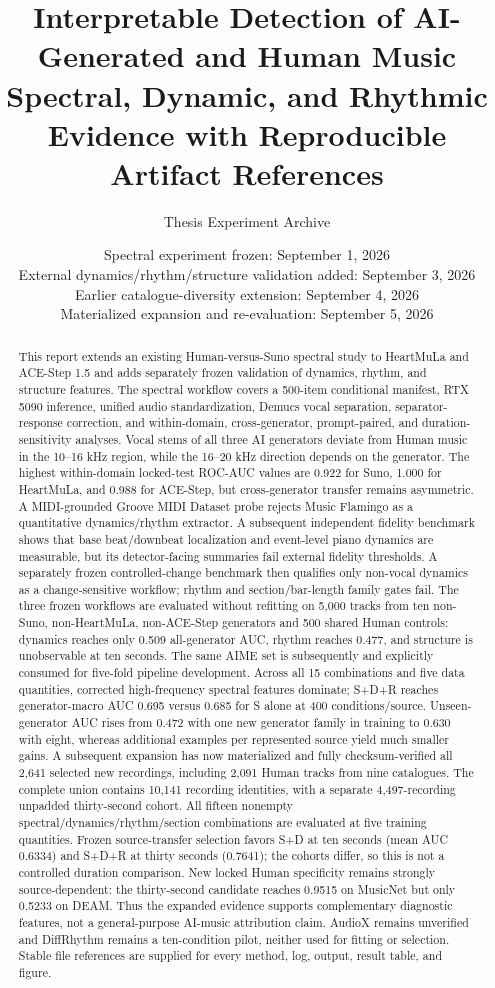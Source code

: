 \documentclass[11pt,a4paper]{article}
\title{Interpretable Detection of AI-Generated and Human Music\\
\large Spectral, Dynamic, and Rhythmic Evidence with Reproducible Artifact References}
\author{Thesis Experiment Archive}
\date{Spectral experiment frozen: September 1, 2026\\External dynamics/rhythm/structure validation added: September 3, 2026\\Earlier catalogue-diversity extension: September 4, 2026\\Materialized expansion and re-evaluation: September 5, 2026}
\begin{document}
\maketitle

\begin{abstract}
This report extends an existing Human-versus-Suno spectral study to HeartMuLa and ACE-Step 1.5 and adds separately frozen validation of dynamics, rhythm, and structure features. The spectral workflow covers a 500-item conditional manifest, RTX 5090 inference, unified audio standardization, Demucs vocal separation, separator-response correction, and within-domain, cross-generator, prompt-paired, and duration-sensitivity analyses. Vocal stems of all three AI generators deviate from Human music in the 10--16 kHz region, while the 16--20 kHz direction depends on the generator. The highest within-domain locked-test ROC-AUC values are 0.922 for Suno, 1.000 for HeartMuLa, and 0.988 for ACE-Step, but cross-generator transfer remains asymmetric. A MIDI-grounded Groove MIDI Dataset probe rejects Music Flamingo as a quantitative dynamics/rhythm extractor. A subsequent independent fidelity benchmark shows that base beat/downbeat localization and event-level piano dynamics are measurable, but its detector-facing summaries fail external fidelity thresholds. A separately frozen controlled-change benchmark then qualifies only non-vocal dynamics as a change-sensitive workflow; rhythm and section/bar-length family gates fail. The three frozen workflows are evaluated without refitting on 5,000 tracks from ten non-Suno, non-HeartMuLa, non-ACE-Step generators and 500 shared Human controls: dynamics reaches only 0.509 all-generator AUC, rhythm reaches 0.477, and structure is unobservable at ten seconds. The same AIME set is subsequently and explicitly consumed for five-fold pipeline development. Across all 15 combinations and five data quantities, corrected high-frequency spectral features dominate; S+D+R reaches generator-macro AUC 0.695 versus 0.685 for S alone at 400 conditions/source. Unseen-generator AUC rises from 0.472 with one new generator family in training to 0.630 with eight, whereas additional examples per represented source yield much smaller gains. A subsequent expansion has now materialized and fully checksum-verified all 2,641 selected new recordings, including 2,091 Human tracks from nine catalogues. The complete union contains 10,141 recording identities, with a separate 4,497-recording unpadded thirty-second cohort. All fifteen nonempty spectral/dynamics/rhythm/section combinations are evaluated at five training quantities. Frozen source-transfer selection favors S+D at ten seconds (mean AUC 0.6334) and S+D+R at thirty seconds (0.7641); the cohorts differ, so this is not a controlled duration comparison. New locked Human specificity remains strongly source-dependent: the thirty-second candidate reaches 0.9515 on MusicNet but only 0.5233 on DEAM. Thus the expanded evidence supports complementary diagnostic features, not a general-purpose AI-music attribution claim. AudioX remains unverified and DiffRhythm remains a ten-condition pilot, neither used for fitting or selection. Stable file references are supplied for every method, log, output, result table, and figure.
\end{abstract}
\end{document}
